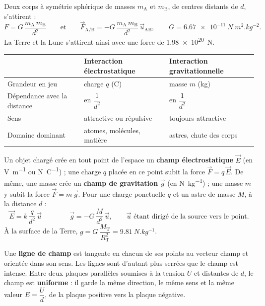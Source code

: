 \begin{loi}
Deux corps à symétrie sphérique de masses $m_\mathrm{A}$ et $m_\mathrm{B}$, de centres distants de $d$, s'attirent :
\[F=G\,\frac{m_\mathrm{A}\,m_\mathrm{B}}{d^2}\qquad\text{et}\qquad\vec{F}_{\mathrm{A}/\mathrm{B}}=-G\,\frac{m_\mathrm{A}\,m_\mathrm{B}}{d^2}\,\vec{u}_{\mathrm{AB}},\qquad G=\qty{6,67e-11}{N.m^2.kg^{-2}}.\]
La Terre et la Lune s'attirent ainsi avec une force de \qty{1,98e20}{N}.
\end{loi}
\begin{propriete}
\par\smallskip\noindent\hfill\begin{tabular}{lll}
\toprule
 & Interaction électrostatique & Interaction gravitationnelle \\
\midrule
Grandeur en jeu & charge $q$ (C) & masse $m$ (kg) \\
Dépendance avec la distance & en $\dfrac{1}{d^2}$ & en $\dfrac{1}{d^2}$ \\
Sens & attractive ou répulsive & toujours attractive \\
Domaine dominant & atomes, molécules, matière & astres, chute des corps \\
\bottomrule
\end{tabular}\hfill\null\par\smallskip
\end{propriete}
\begin{definition}
Un objet chargé crée en tout point de l'espace un \textbf{champ électrostatique} $\vec{E}$ (en \unit{V.m^{-1}} ou \unit{N.C^{-1}}) ; une charge $q$ placée
en ce point subit la force $\vec{F}=q\,\vec{E}$. De même, une masse crée un \textbf{champ de gravitation} $\vec{g}$ (en \unit{N.kg^{-1}}) ; une
masse $m$ y subit la force $\vec{F}=m\,\vec{g}$. Pour une charge ponctuelle $q$ et un astre de masse $M$, à la distance $d$ :
\[\vec{E}=k\,\frac{q}{d^2}\,\vec{u}\qquad\qquad\vec{g}=-G\,\frac{M}{d^2}\,\vec{u},\qquad\text{$\vec{u}$ étant dirigé de la source vers le point.}\]
À la surface de la Terre, $g=G\,\dfrac{M_\mathrm{T}}{R_\mathrm{T}^2}=\qty{9,81}{N.kg^{-1}}$.
\end{definition}
\begin{propriete}
Une \textbf{ligne de champ} est tangente en chacun de ses points au vecteur champ et orientée dans son sens. Les lignes sont
d'autant plus serrées que le champ est intense. Entre deux plaques parallèles soumises à la tension $U$ et distantes de $d$,
le champ est \textbf{uniforme} : il garde la même direction, le même sens et la même valeur $E=\dfrac{U}{d}$, de la plaque positive vers la
plaque négative.
\end{propriete}
